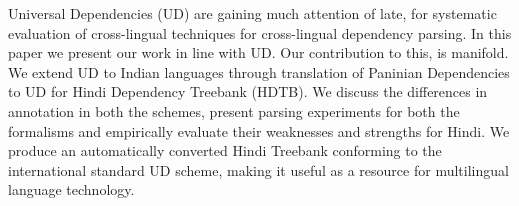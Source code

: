 Universal Dependencies (UD) are gaining much attention of late, for systematic evaluation of cross-lingual techniques for cross-lingual dependency parsing. In this paper we present our work in line with UD. Our contribution to this, is manifold. We extend UD to Indian languages through translation of Paninian Dependencies to UD for Hindi Dependency Treebank (HDTB). We discuss the differences in annotation in both the schemes, present parsing experiments for both the formalisms and empirically evaluate their weaknesses and strengths for Hindi. We produce an automatically converted Hindi Treebank conforming to the international standard UD scheme, making it useful as a resource for multilingual language technology.
